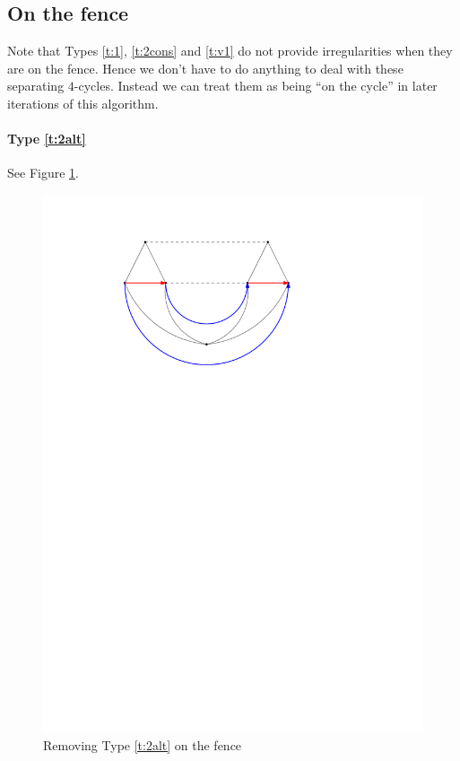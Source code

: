 \subsection{On the fence}
  Note that Types \ref{t:1}, \ref{t:2cons} and \ref{t:v1} do not provide irregularities when they are on the fence. Hence we don't have to do anything to deal with these separating $4$-cycles. Instead we can treat them as being ``on the cycle'' in later iterations of this algorithm.


  \paragraph{Type \ref{t:2alt}}
  See Figure \ref{fig:4c:fence_c}.

  \begin{figure}[h]
    \centering
    \includegraphics[scale=1]{4cycles/img/fence_c}
    \caption{Removing Type \ref{t:2alt} on the fence}
    \label{fig:4c:fence_c}
  \end{figure}

